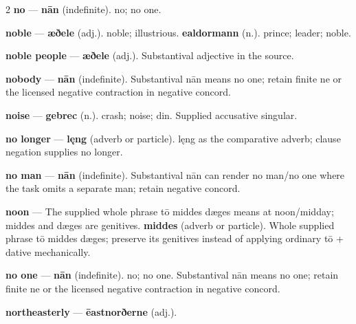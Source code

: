 \begin{multicols}{2}
\textbf{no} — \textbf{nān} (indefinite). no; no one.\par
\textbf{noble} — \textbf{æðele} (adj.). noble; illustrious. \textbf{ealdormann} (n.). prince; leader; noble.\par
\textbf{noble people} — \textbf{æðele} (adj.). Substantival adjective in the source.\par
\textbf{nobody} — \textbf{nān} (indefinite). Substantival nān means no one; retain finite ne or the licensed negative contraction in negative concord.\par
\textbf{noise} — \textbf{gebrec} (n.). crash; noise; din. Supplied accusative singular.\par
\textbf{no longer} — \textbf{lęng} (adverb or particle). lęng as the comparative adverb; clause negation supplies no longer.\par
\textbf{no man} — \textbf{nān} (indefinite). Substantival nān can render no man/no one where the task omits a separate man; retain negative concord.\par
\textbf{noon} — The supplied whole phrase tō middes dæges means at noon/midday; middes and dæges are genitives. \textbf{middes} (adverb or particle). Whole supplied phrase tō middes dæges; preserve its genitives instead of applying ordinary tō + dative mechanically.\par
\textbf{no one} — \textbf{nān} (indefinite). no; no one. Substantival nān means no one; retain finite ne or the licensed negative contraction in negative concord.\par
\textbf{northeasterly} — \textbf{ēastnorðerne} (adj.).\par

\end{multicols}
